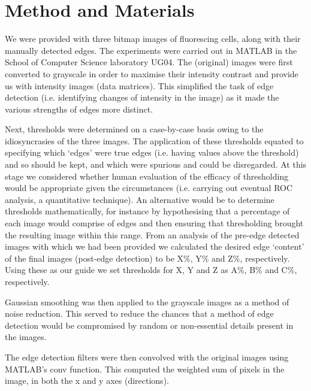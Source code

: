 \documentclass{article}
\begin{document}
\section{Method and Materials}

We were provided with three bitmap images of fluorescing cells, along with their manually detected edges. The experiments were carried out in MATLAB in the School of Computer Science laboratory UG04.
The (original) images were first converted to grayscale in order to maximise their intensity contrast and provide us with intensity images (data matrices). This simplified the task of edge detection (i.e. identifying changes of intensity in the image) as it made the various strengths of edges more distinct.


Next, thresholds were determined on a case-by-case basis owing to the idiosyncrasies of the three images. The application of these thresholds equated to specifying which ‘edges’ were true edges (i.e. having values above the threshold) and so should be kept, and which were spurious and could be disregarded. At this stage we considered whether human evaluation of the efficacy of thresholding would be appropriate given the circumstances (i.e. carrying out eventual ROC analysis, a quantitative technique). An alternative would be to determine thresholds mathematically, for instance by hypothesising that a percentage of each image would comprise of edges and then ensuring that thresholding brought the resulting image within this range. From an analysis of the pre-edge detected images with which we had been provided we calculated the desired edge ‘content’ of the final images (post-edge detection) to be X\%, Y\% and Z\%, respectively. Using these as our guide we set thresholds for X, Y and Z as A\%, B\% and C\%, respectively.

Gaussian smoothing was then applied to the grayscale images as a method of noise reduction. This served to reduce the chances that a method of edge detection would be compromised by random or non-essential details present in the images.

The edge detection filters were then convolved with the original images using MATLAB’s conv function. This computed the weighted sum of pixels in the image, in both the x and y axes (directions).
\end{document}
